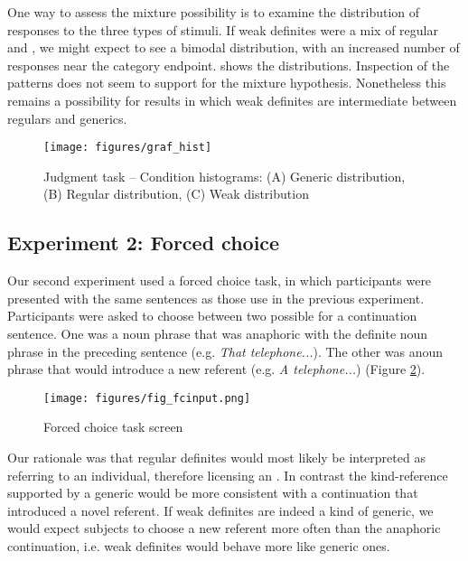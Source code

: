 \documentclass[output=paper,
modfonts
]{langscibook}
\begin{document}
One way to assess the mixture possibility is to examine the distribution of responses to the three types of stimuli.  If weak definites were a mix of regular and , we might expect to see a bimodal distribution, with an increased number of responses near the category endpoint.  shows the distributions. Inspection of the patterns does not seem to support for the mixture hypothesis. Nonetheless this remains a possibility for results in which weak definites are intermediate between regulars and generics.   

\begin{figure}[H]
\centering
\texttt{[image: figures/graf\_hist]}
\caption{Judgment task -- Condition histograms: (A) Generic distribution, (B) Regular distribution, (C) Weak distribution}
\label{fig:desaetal:5}
\end{figure}

\subsection{Experiment 2: Forced choice}

Our second experiment used a forced choice task, in which participants were presented with the same sentences as those use in the previous experiment. Participants were asked to choose between two possible  for a continuation sentence.  One was a noun phrase that was anaphoric with the definite noun phrase in the preceding sentence (e.g. \textit{That telephone...}).  The other was a\largerpage noun phrase that would introduce a new referent (e.g. \textit{A telephone...}) (Figure \ref{fig:desaetal:6}). 

\begin{figure}[H]
\centering
\texttt{[image: figures/fig\_fcinput.png]}
\caption{Forced choice task screen}
\label{fig:desaetal:6}
\end{figure}

Our rationale was that regular definites would most likely be interpreted as referring to an individual, therefore licensing an .  In contrast the kind-reference supported by a generic would be more consistent with a continuation that introduced a novel referent. If weak definites are indeed a kind of generic, we would expect subjects to choose a new referent more often than the anaphoric continuation, i.e. weak definites would behave more like generic ones. 
\end{document}

